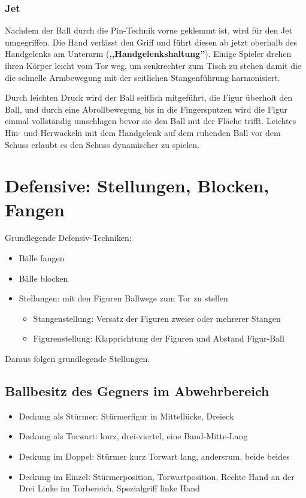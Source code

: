 \subsubsection{Jet}
\label{technik:offensive:schiessen:jet}
Nachdem der Ball durch die Pin-Technik vorne geklemmt ist, wird für den Jet umgegriffen.
Die Hand verlässt den Griff und führt diesen ab jetzt oberhalb des Handgelenks am Unterarm (\textbf{,,Handgelenkshaltung''}).
Einige Spieler drehen ihren Körper leicht vom Tor weg, um senkrechter zum Tisch zu stehen damit die die schnelle Armbewegung mit der seitlichen Stangenführung harmonisiert.

Durch leichten Druck wird der Ball seitlich mitgeführt, die Figur überholt den Ball, und durch eine Abrollbewegung bis in die Fingersputzen wird die Figur einmal vollständig umschlagen bevor sie den Ball mit der Fläche trifft.
Leichtes Hin- und Herwackeln mit dem Handgelenk auf dem ruhenden Ball vor dem Schuss erlaubt es den Schuss dynamischer zu spielen.


\section{Defensive: Stellungen, Blocken, Fangen}
\label{technik:defensive}

Grundlegende Defensiv-Techniken:
\begin{itemize}
\item Bälle fangen
\item Bälle blocken
\item Stellungen: mit den Figuren Ballwege zum Tor zu stellen  
    \begin{itemize}
    \item Stangenstellung: Versatz der Figuren zweier oder mehrerer Stangen
    \item Figurenstellung: Klapprichtung der Figuren und Abstand Figur-Ball
    \end{itemize}
\end{itemize}
Daraus folgen grundlegende Stellungen.

\subsection{Ballbesitz des Gegners im Abwehrbereich}
\label{technik:defensive:gegnerabwehr}

\begin{itemize}
\item Deckung als Stürmer: Stürmerfigur in Mittellücke, Dreieck
\item Deckung als Torwart: kurz, drei-viertel, eine Band-Mitte-Lang
\item Deckung im Doppel: Stürmer kurz Torwart lang, andersrum, beide beides 
\item Deckung im Einzel: Stürmerposition, Torwartposition, Rechte Hand an der Drei Linke im Torbereich, Spezialgriff linke Hand 
\end{itemize}


